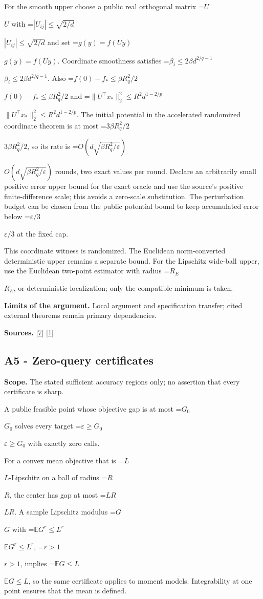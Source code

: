 \documentclass[10pt,a4paper]{article}
\newcommand{\AtlasMath}[1]{\par\begingroup\centering\setbox0=\hbox{$\displaystyle #1$}\ifdim\wd0>1.4\linewidth\typeout{ATLAS WIDE FORMULA: \the\wd0}\fi\ifdim\wd0>\linewidth\resizebox{\linewidth}{!}{\box0}\else\box0\fi\par\endgroup}
\newcommand{\AtlasInlineMath}[1]{\begingroup\setbox0=\hbox{$#1$}\ifdim\wd0>.4\linewidth\endgroup\AtlasMath{#1}\else\endgroup$#1$\fi}
\begin{document}
For the smooth upper choose a public real orthogonal matrix \AtlasInlineMath{U} with \AtlasInlineMath{|U_{ij}|\le\sqrt{2/d}} and set \AtlasInlineMath{g(y)=f(Uy)}. Coordinate smoothness satisfies \AtlasInlineMath{\beta_i\le2\beta d^{2/q-1}}. Also \AtlasInlineMath{f(0)-f_*\le\beta R_q^2/2} and \AtlasInlineMath{\|U^\top x_*\|_2^2\le R^2d^{1-2/p}}. The initial potential in the accelerated randomized coordinate theorem is at most \AtlasInlineMath{3\beta R_q^2/2}, so its rate is \AtlasInlineMath{O(d\sqrt{\beta R_q^2/\varepsilon})} rounds, two exact values per round. Declare an arbitrarily small positive error upper bound for the exact oracle and use the source's positive finite-difference scale; this avoids a zero-scale substitution. The perturbation budget can be chosen from the public potential bound to keep accumulated error below \AtlasInlineMath{\varepsilon/3} at the fixed cap.

This coordinate witness is randomized. The Euclidean norm-converted deterministic upper remains a separate bound. For the Lipschitz wide-ball upper, use the Euclidean two-point estimator with radius \AtlasInlineMath{R_E}, or deterministic localization; only the compatible minimum is taken.

\textbf{Limits of the argument.} Local argument and specification transfer; cited external theorems remain primary dependencies.

\textbf{Sources.} \href{https://arxiv.org/pdf/1707.08486v2}{[7]} \href{https://arxiv.org/html/2610.00345v1}{[1]}

\subsection{A5 - Zero-query certificates}
\textbf{Scope.} The stated sufficient accuracy regions only; no assertion that every certificate is sharp.

A public feasible point whose objective gap is at most \AtlasInlineMath{G_0} solves every target \AtlasInlineMath{\varepsilon\ge G_0} with exactly zero calls.

For a convex mean objective that is \AtlasInlineMath{L}-Lipschitz on a ball of radius \AtlasInlineMath{R}, the center has gap at most \AtlasInlineMath{LR}. A sample Lipschitz modulus \AtlasInlineMath{G} with \AtlasInlineMath{\mathbb E G^r\le L^r}, \AtlasInlineMath{r>1}, implies \AtlasInlineMath{\mathbb E G\le L}, so the same certificate applies to moment models. Integrability at one point ensures that the mean is defined.
\end{document}
